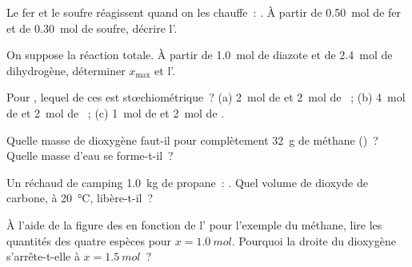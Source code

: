 \begin{exercise}[$\star$]\label{exo:g10:reaction-progress-table:3}
Le fer et le soufre réagissent quand on les chauffe~: .
À partir de \qty{0.50}{mol} de fer et de \qty{0.30}{mol} de soufre,
décrire l'.
\end{exercise}

\begin{exercise}[$\star$]\label{exo:g10:reaction-progress-table:4}
On suppose la réaction  totale. À partir de
\qty{1.0}{mol} de diazote et de \qty{2.4}{mol} de dihydrogène,
déterminer $x_{\max}$ et l'.
\end{exercise}

\begin{exercise}[$\star$]\label{exo:g10:reaction-progress-table:5}
Pour , lequel de ces  est
stœchiométrique~? (a) \qty{2}{mol} de  et \qty{2}{mol} de
~; (b) \qty{4}{mol} de  et \qty{2}{mol} de ~;
(c) \qty{1}{mol} de  et \qty{2}{mol} de .
\end{exercise}

\begin{exercise}[$\star\star$]\label{exo:g10:reaction-progress-table:6}
Quelle masse de dioxygène faut-il pour  complètement \qty{32}{g}
de méthane ()~? Quelle masse d'eau se
forme-t-il~?
\end{exercise}

\begin{exercise}[$\star\star$]\label{exo:g10:reaction-progress-table:7}
Un réchaud de camping  \qty{1.0}{kg} de propane~:
. Quel volume de dioxyde de carbone, à
\qty{20}{\celsius}, libère-t-il~?
\end{exercise}

\begin{exercise}[$\star\star$]\label{exo:g10:reaction-progress-table:8}
À l'aide de la figure des  en fonction de
l' pour l'exemple du méthane, lire les quantités des quatre
espèces pour $x = \qty{1.0}{mol}$. Pourquoi la droite du dioxygène
s'arrête-t-elle à $x = \qty{1.5}{mol}$~?
\end{exercise}

